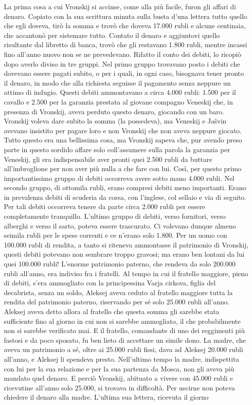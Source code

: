 La prima cosa a cui Vronskij si accinse, come alla più facile, furon gli affari di denaro. Copiato con la sua scrittura minuta sulla busta d'una lettera tutto quello che egli doveva, tirò la somma e trovò che doveva 17.000 rubli e alcune centinaia, che accantonò per sistemare tutto. Contato il denaro e aggiuntovi quello risultante dal libretto di banca, trovò che gli restavano 1.800 rubli, mentre incassi fino all'anno nuovo non se ne prevedevano. Rifatto il conto dei debiti, lo ricopiò dopo averlo diviso in tre gruppi. Nel primo gruppo trovavano posto i debiti che dovevano essere pagati subito, o per i quali, in ogni caso, bisognava tener pronto il denaro, in modo che alla richiesta seguisse il pagamento senza neppure un attimo di indugio. Questi debiti ammontavano a circa 4.000 rubli: 1.500 per il cavallo e 2.500 per la garanzia prestata al giovane compagno Veneskij che, in presenza di Vronskij, aveva perduto questo denaro, giocando con un baro. Vronskij voleva dare subito la somma (la possedeva), ma Veneskij e Jašvin avevano insistito per pagare loro e non Vronskij che non aveva neppure giocato. Tutto questo era una bellissima cosa, ma Vronskij sapeva che, pur avendo preso parte in questo sordido affare solo coll'assumere sulla parola la garanzia per Veneskij, gli era indispensabile aver pronti quei 2.500 rubli da buttare all'imbroglione per non aver più nulla a che fare con lui. Così, per questo primo importantissimo gruppo di debiti occorreva avere sotto mano 4.000 rubli. Nel secondo gruppo, di ottomila rubli, erano compresi debiti meno importanti. Erano in prevalenza debiti di scuderia da corsa, con l'inglese, col sellaio e via di seguito. Per tali debiti occorreva tenere da parte circa 2.000 rubli per essere completamente tranquillo. L'ultimo gruppo di debiti, verso fornitori, verso alberghi e verso il sarto, poteva essere trascurato. Ci volevano dunque almeno seimila rubli per le spese correnti e ce n'erano solo 1.800. Per un uomo con 100.000 rubli di rendita, a tanto si riteneva ammontasse il patrimonio di Vronskij, questi debiti potevano non sembrare troppo gravosi; ma erano ben lontani da lui quei 100.000 rubli! L'enorme patrimonio paterno, che rendeva da solo 200.000 rubli all'anno, era indiviso fra i fratelli. Al tempo in cui il fratello maggiore, pieno di debiti, s'era ammogliato con la principessina Varja cirkova, figlia del decabrista, senza un soldo, Aleksej aveva ceduto al fratello maggiore tutta la rendita del patrimonio paterno, riservando per sé solo 25.000 rubli all'anno. Aleksej aveva detto allora al fratello che questa somma gli sarebbe stata sufficiente fino al giorno in cui non si sarebbe ammogliato, il che probabilmente non si sarebbe verificato mai. E il fratello, comandante di uno dei reggimenti più fastosi e da poco sposato, fu ben lieto di accettare un simile dono. La madre, che aveva un patrimonio a sé, oltre ai 25.000 rubli fissi, dava ad Aleksej 20.000 rubli all'anno, e Aleksej li spendeva presto. Nell'ultimo tempo la madre, indispettita con lui per la sua relazione e per la sua partenza da Mosca, non gli aveva più mandato quel denaro. E perciò Vronskij, abituato a vivere con 45.000 rubli e ricevutine all'anno solo 25.000, si trovava in difficoltà. Per uscirne non poteva chiedere il denaro alla madre. L'ultima sua lettera, ricevuta il giorno 